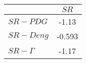 \begin{tabular}{l|c}
\toprule
{} &   $SR$ \\
\midrule
\textbf{$SR-PDG$   } &  -1.13 \\
\textbf{$SR-Deng$  } & -0.593 \\
\textbf{$SR-\Gamma$} &  -1.17 \\
\bottomrule
\end{tabular}
